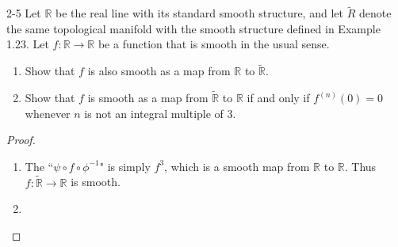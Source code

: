 \begin{customprob}{2-5}\label{problem_2_5}
  Let $\mathbb{R}$ be the real line with its standard smooth structure, and let $\tilde{R}$ denote the same topological manifold with the smooth structure defined in Example 1.23.
  Let $f: \mathbb{R} \rightarrow \mathbb{R}$ be a function that is smooth in the usual sense.
  \begin{enumerate}[label=(\alph*)]
    \item 
      Show that $f$ is also smooth as a map from $\mathbb{R}$ to $\tilde{\mathbb{R}}$.
    \item
      Show that $f$ is smooth as a map from $\tilde{\mathbb{R}}$ to $\mathbb{R}$ if and only if $f^{(n)}(0) = 0$ whenever $n$ is not an integral multiple of 3.
  \end{enumerate}
\end{customprob}

\begin{proof}
  $ $
  \begin{enumerate}[label=(\alph*)]
    \item 
      The ``$\psi \circ f \circ \phi^{-1}$" is simply $f^3$, which is a smooth map from $\mathbb{R}$ to $\mathbb{R}$.
      Thus $f: \tilde{\mathbb{R}} \rightarrow \mathbb{R}$ is smooth.
    \item
  \end{enumerate}
\end{proof}
